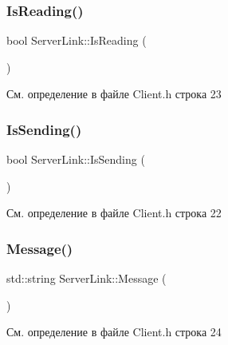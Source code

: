 \subsubsection{\texorpdfstring{IsReading()}{IsReading()}}
{\footnotesize\ttfamily bool Server\+Link\+::\+Is\+Reading (\begin{DoxyParamCaption}{ }\end{DoxyParamCaption})\hspace{0.3cm}{\ttfamily [inline]}}



См. определение в файле Client.\+h строка 23

\mbox{\label{class_server_link_ab79487df49a22e5533c96032ef413e16}} 
\subsubsection{\texorpdfstring{IsSending()}{IsSending()}}
{\footnotesize\ttfamily bool Server\+Link\+::\+Is\+Sending (\begin{DoxyParamCaption}{ }\end{DoxyParamCaption})\hspace{0.3cm}{\ttfamily [inline]}}



См. определение в файле Client.\+h строка 22

\mbox{\label{class_server_link_a712791c09323fcf6db49ceb0a10f8d9c}} 
\subsubsection{\texorpdfstring{Message()}{Message()}}
{\footnotesize\ttfamily std\+::string Server\+Link\+::\+Message (\begin{DoxyParamCaption}{ }\end{DoxyParamCaption})\hspace{0.3cm}{\ttfamily [inline]}}



См. определение в файле Client.\+h строка 24

\mbox{\label{class_server_link_a57df20ef340ea6f42157ff40aa57427a}} 
